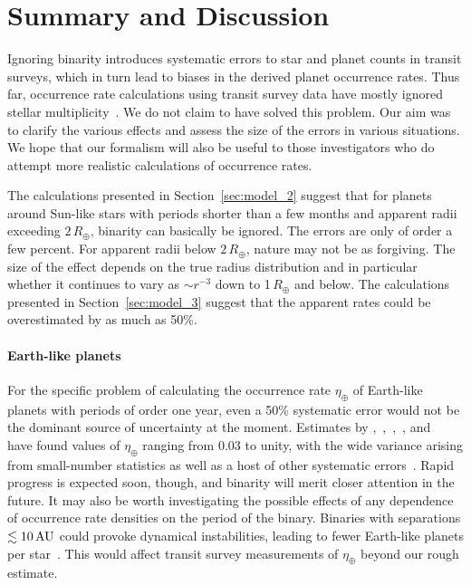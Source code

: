 \documentclass[12pt,modern]{aastex61}
\begin{document}

\section{Summary and Discussion}
\label{sec:discussion}

Ignoring binarity introduces systematic errors to star and planet
counts in transit surveys, which in turn lead to biases in the derived
planet occurrence rates.  Thus far, occurrence rate calculations using
transit survey data have mostly ignored stellar
multiplicity~\citep[\textit{e.g.},][]{howard_planet_2012,fressin_false_2013,foreman-mackey_exoplanet_2014,dressing_occurrence_2015,burke_terrestrial_2015}.
We do not claim to have solved this problem. Our aim was to clarify
the various effects and assess the size of the errors in various
situations. We hope that our formalism will also be useful to those
investigators who do attempt more realistic calculations of occurrence
rates.

The calculations presented in Section~\ref{sec:model_2} suggest that
for planets around Sun-like stars with periods shorter than a few
months and apparent radii exceeding $2\,R_\oplus$, binarity can
basically be ignored.  The errors are only of order a few percent.
For apparent radii below $2\,R_\oplus$, nature may not be as
forgiving.  The size of the effect depends on the true radius
distribution and in particular whether it continues to vary as
$\sim$$r^{-3}$ down to 1\,$R_\oplus$ and below.  The calculations
presented in Section~\ref{sec:model_3} suggest that the apparent rates
could be overestimated by as much as 50\%.

\paragraph{Earth-like planets} For the specific problem of calculating
the occurrence rate $\eta_\oplus$ of Earth-like planets with periods
of order one year, even a 50\% systematic error would not be the
dominant source of uncertainty at the moment.  Estimates by
\citet{youdin_exoplanet_2011},~\citet{petigura_prevalence_2013},~\citet{dong_fast_2013},~\citet{foreman-mackey_exoplanet_2014},
and~\citet{burke_terrestrial_2015} have found values of $\eta_\oplus$
ranging from $0.03$ to unity, with the wide variance arising from
small-number statistics as well as a host of other systematic
errors~\citep[see][Figure~17]{burke_terrestrial_2015}.  Rapid progress
is expected soon, though, and binarity will merit closer attention in
the future.  It may also be worth investigating the possible effects
of any dependence of occurrence rate densities on the period of the
binary.  Binaries with separations $\lesssim 10\,{\rm AU}$ could
provoke dynamical instabilities, leading to fewer Earth-like planets
per
star~\citep[\textit{e.g.},][]{holman_long-term_1999,wang_influence_2014,
kraus_impact_2016}.  This would affect transit survey measurements of
$\eta_\oplus$ beyond our rough estimate.
\end{document}
